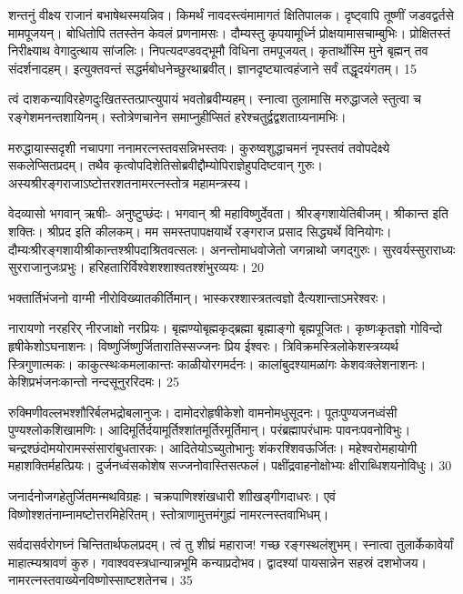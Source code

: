 शन्तनुं वीक्ष्य राजानं बभाषेथस्मयन्निव।
किमर्थं नावदस्त्वंमामागतं क्षितिपालक।
दृष्ट्वापि तूष्णीं जडवद्वर्तसे मामपूजयन्।
बोधितोपि ततस्तेन केवलं प्रणनामसः।
दौम्यस्तु कृपयामूर्ध्नि प्रोक्षयामासचाम्बुभिः।
प्रोक्षितस्तं निरीक्ष्याथ वेगादुत्थाय सांजलिः।
निपत्यदण्डवद्भूमौ विधिना तमपूजयत्।
कृतार्थोस्मि मुने बृह्मन् तव संदर्शनादहम्।
इत्युक्तवन्तं सद्धर्मबोधनेच्छुरथाब्रवीत्।
ज्ञानदृष्ट्यात्वहंजाने सर्वं तद्धृदयंगतम्।
15

त्वं दाशकन्याविरहेणदुःखितस्तत्प्राप्त्युपायं भवतोब्रवीम्यहम्।
स्नात्वा तुलामासि मरुद्धाजले स्तुत्वा च रङ्गेशमनन्तशायिनम्।
स्तोत्रेणचानेन समाप्नुहीप्सितं हरेश्चतुर्द्वद्वशताग्र्यनामभिः।

मरुद्धायास्सदृशी नचापगा ननामरत्नस्तवसन्निभस्तवः।
कुरुष्वशुद्धाचमनं नृपस्तवं तवोपदेक्ष्ये सकलेप्सितप्रदम्।
तथैव कृत्वोपदिशेतिसोब्रवीद्दौम्योपिराज्ञेहुपदिष्टवान्
गुरुः।
अस्यश्रीरङ्गराजाऽष्टोत्तरशतनामरत्नस्तोत्र
महामन्त्रस्य।

वेदव्यासो भगवान् ऋषीः- अनुष्टुप्छंदः।
भगवान् श्री महाविष्णुर्देवता।
श्रीरङ्गशायेतिबीजम्।
श्रीकान्त इति शक्तिः।
श्रीप्रद इति कीलकम्।
मम समस्तपापक्षयार्थे रङ्गराज प्रसाद सिद्ध्यर्थे विनियोगः।
दौम्यःश्रीरङ्गशायीश्रीकान्तश्श्रीपदाश्रितवत्सलः।
अनन्तोमाधवोजेतो जगन्नाथो जगद्गुरुः।
सुरवर्यस्सुराराध्यः सुरराजानुजःप्रभुः।
हरिहतारिर्विश्वेशश्शाश्वतश्शंभुरव्ययः।
20

भक्तार्तिभंजनो वाग्मी नीरोविख्यातकीर्तिमान्।
भास्करश्शास्त्रतत्वज्ञो दैत्यशान्ताऽमरेश्वरः।

नारायणो नरहरिर् नीरजाक्षो नरप्रियः।
बृह्मण्योबृह्मकृद्ब्रह्मा बृह्माङ्गो बृह्मपूजितः।
कृष्णःकृतज्ञो गोविन्दो हृषीकेशोऽघनाशनः।
विष्णुर्जिष्णुर्जितारातिस्सज्जनः प्रिय ईश्वरः।
त्रिविक्रमस्त्रिलोकेशस्त्रय्यर्थ स्त्रिगुणात्मकः।
काकुत्स्थःकमलाकान्तः काळीयोरगमर्दनः।
कालांबुदश्यामळांगः केशवःक्लेशनाशनः।
केशिप्रभंजनःकान्तो नन्दसूनुररिदमः।
25

रुक्मिणीवल्लभश्शौरिर्बलभद्रोबलानुजः।
दामोदरोहृषीकेशो वामनोमधुसूदनः।
पूतःपुण्यजनध्वंसी पुण्यश्लोकशिखामणिः।
आदिमूर्तिर्दयामूर्तिश्शांतमूर्तिरमूर्तिमान्।
परंब्रह्मापरंधामः पावनःपवनोविभुः।
चन्द्रश्छंदोमयोरामस्संसारांबुधतारकः।
आदितेयोऽच्युतोभानुः शंकरश्शिवऊर्जितः।
महेश्वरोमहायोगी महाशक्तिर्महत्प्रियः।
दुर्जनध्वंसकोशेष सज्जनोवास्तिसत्फलं।
पक्षींद्रवाहनोक्षोभ्यः क्षीराब्धिशयनोविधुः।
30

जनार्दनोजगहेतुर्जितमन्मथविग्रहः।
चक्रपाणिश्शंखधारी शाीखड्गीगदाधरः।
एवं विष्णोश्शतंनाम्नामष्टोत्तरमिहेरितम्।
स्तोत्राणामुत्तमंगुह्यं नामरत्नस्तवाभिधम्।

सर्वदासर्वरोगघ्नं चिन्तितार्थफलप्रदम्।
त्वं तु शीघ्रं महाराज! गच्छ रङ्गस्थलंशुभम्।
स्नात्वा तुलार्केकावेर्यां माहात्म्यश्रावणं कुरु।
गवाश्ववस्त्रधान्यान्नभूमि कन्याप्रदोभव।
द्वादश्यां पायसान्नेन सहस्रं दशभोजय।
नामरत्नस्तवाख्येनविष्णोस्साष्टशतेनच।
35

